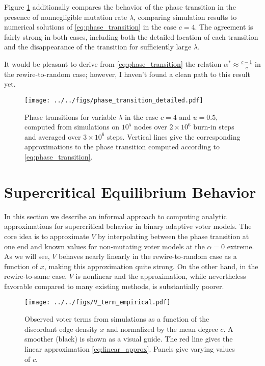 \documentclass[english]{scrartcl}
\begin{document}
	Figure \ref{fig:transition_mutation} additionally compares the behavior of the phase transition in the presence of nonnegligible mutation rate $\lambda$, comparing simulation results to numerical solutions of \eqref{eq:phase_transition} in the case $c = 4$. The agreement is fairly strong in both cases, including both the detailed location of each transition and the disappearance of the transition for sufficiently large $\lambda$. 

	It would be pleasant to derive from \eqref{eq:phase_transition} the relation $\alpha^* \approx \frac{c-1}{c}$ in the rewire-to-random case; however, I haven't found a clean path to this result yet. 

	\begin{figure}
		\centering
		\texttt{[image: ../../figs/phase\_transition\_detailed.pdf]}
		\caption{Phase transitions for variable $\lambda$ in the case $c = 4$ and $u = 0.5$, computed from simulations on $10^5$ nodes over $2\times 10^6$ burn-in steps and averaged over $3 \times 10^6$ steps. Vertical lines give the corresponding  approximations to the phase transition computed according to \eqref{eq:phase_transition}.} \label{fig:transition_mutation}
	\end{figure}

\section{Supercritical Equilibrium Behavior}
	In this section we describe an informal approach to computing analytic approximations for supercritical behavior in binary adaptive voter models. The core idea is to approximate $V$ by interpolating between the phase transition at one end and known values for non-mutating voter models at the $\alpha = 0$ extreme. As we will see, $V$ behaves nearly linearly in the rewire-to-random case as a function of $x$, making this approximation quite strong. On the other hand, in the rewire-to-same case, $V$ is nonlinear and the approximation, while nevertheless favorable compared to many existing methods, is substantially poorer. 


	\begin{figure}
		\centering 
		\texttt{[image: ../../figs/V\_term\_empirical.pdf]}
		\caption{Observed voter terms from simulations as a function of the discordant edge density $x$ and normalized by the mean degree $c$. A smoother (black) is shown as a visual guide. The red line gives the linear approximation \eqref{eq:linear_approx}. Panels give varying values of $c$.} \label{fig:linear_approx}
	\end{figure}
\end{document}
